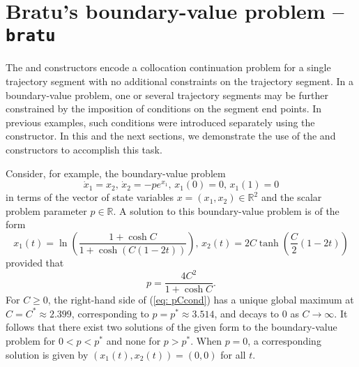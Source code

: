 \section{Bratu's boundary-value problem -- \texttt{bratu}}
The  and  constructors encode a collocation continuation problem for a single trajectory segment with no additional constraints on the trajectory segment. In a boundary-value problem, one or several trajectory segments may be further constrained by the imposition of conditions on the segment end points. In previous examples, such conditions were introduced separately using the  constructor. In this and the next sections, we demonstrate the use of the  and  constructors to accomplish this task.

Consider, for example, the boundary-value problem
\begin{equation}
\dot{x}_1=x_2,\,\dot{x}_2=-pe^{x_1},\,x_1(0)=0,\,x_1(1)=0
\end{equation}
in terms of the vector of state variables $x=(x_1,x_2)\in\mathbb{R}^2$ and the scalar problem parameter $p\in\mathbb{R}$. A solution to this boundary-value problem is of the form
\begin{equation}
x_1(t)=\ln\left(\frac{1+\cosh C}{1+\cosh\left(C(1-2t)\right)}\right),\,x_2(t)=2C\tanh\left(\frac{C}{2}(1-2t)\right)
\end{equation}
provided that
\begin{equation}
p=\frac{4C^2}{1+\cosh C}.
\label{eq: pCcond}
\end{equation}
For $C\ge 0$, the right-hand side of (\ref{eq: pCcond}) has a unique global maximum at $C=C^\ast\approx 2.399$, corresponding to $p=p^\ast\approx3.514$, and decays to $0$ as $C\rightarrow\infty$. It follows that there exist two solutions of the given form to the boundary-value problem for $0<p<p^\ast$ and none for $p>p^\ast$. When $p=0$, a corresponding solution is given by $(x_1(t),x_2(t))=(0,0)$ for all $t$.

